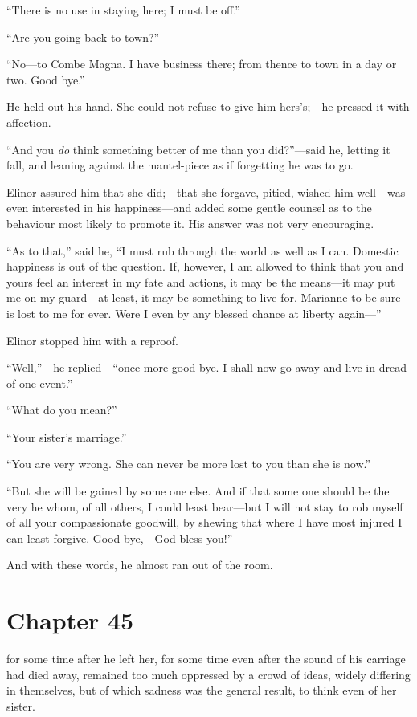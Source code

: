 ``There is no use in staying here; I must be off.''

``Are you going back to town?''

``No---to Combe Magna.  I have business there;
from thence to town in a day or two.  Good bye.''

He held out his hand.  She could not refuse to give
him hers's;---he pressed it with affection.

``And you \emph{do} think something better of me than
you did?''---said he, letting it fall, and leaning against
the mantel-piece as if forgetting he was to go.

Elinor assured him that she did;---that she forgave,
pitied, wished him well---was even interested in his
happiness---and added some gentle counsel as to the behaviour
most likely to promote it.  His answer was not very encouraging.

``As to that,'' said he, ``I must rub through the world
as well as I can.  Domestic happiness is out of the question.
If, however, I am allowed to think that you and yours feel
an interest in my fate and actions, it may be the means---it
may put me on my guard---at least, it may be something to
live for.  Marianne to be sure is lost to me for ever.
Were I even by any blessed chance at liberty again---''

Elinor stopped him with a reproof.

``Well,''---he replied---``once more good bye. I shall
now go away and live in dread of one event.''

``What do you mean?''

``Your sister's marriage.''

``You are very wrong.  She can never be more lost
to you than she is now.''

``But she will be gained by some one else.  And if
that some one should be the very he whom, of all others,
I could least bear---but I will not stay to rob myself
of all your compassionate goodwill, by shewing
that where I have most injured I can least forgive.
Good bye,---God bless you!''

And with these words, he almost ran out of the room.



\chapter{Chapter 45}


 for some time after he left her, for some time
even after the sound of his carriage had died away, remained
too much oppressed by a crowd of ideas, widely differing in
themselves, but of which sadness was the general result,
to think even of her sister.

